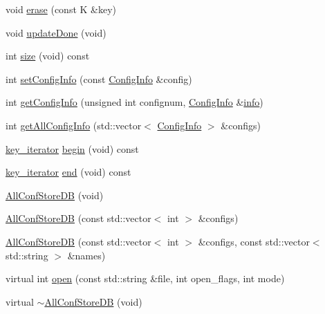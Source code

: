 \begin{DoxyCompactItemize}
\item 
void \mbox{\hyperlink{classFILEDB_1_1AllConfStoreDB_afb092d33f9ca14ca30918d6cb8251fdb}{erase}} (const K \&key)
\item 
void \mbox{\hyperlink{classFILEDB_1_1AllConfStoreDB_ac90e596f6c914145130719ec5ac13593}{update\+Done}} (void)
\item 
int \mbox{\hyperlink{classFILEDB_1_1AllConfStoreDB_a78dd830c5211b3b00b8eae6170ffc9d6}{size}} (void) const
\item 
int \mbox{\hyperlink{classFILEDB_1_1AllConfStoreDB_a2062f555d190a3c52cc942447a090b8a}{set\+Config\+Info}} (const \mbox{\hyperlink{classFILEDB_1_1ConfigInfo}{Config\+Info}} \&config)
\item 
int \mbox{\hyperlink{classFILEDB_1_1AllConfStoreDB_a351639b9e19297abfa7b8b1aca013770}{get\+Config\+Info}} (unsigned int confignum, \mbox{\hyperlink{classFILEDB_1_1ConfigInfo}{Config\+Info}} \&\mbox{\hyperlink{structinfo}{info}})
\item 
int \mbox{\hyperlink{classFILEDB_1_1AllConfStoreDB_aeb8e6daf1a1f9b7a19899cf7db365632}{get\+All\+Config\+Info}} (std\+::vector$<$ \mbox{\hyperlink{classFILEDB_1_1ConfigInfo}{Config\+Info}} $>$ \&configs)
\item 
\mbox{\hyperlink{classFILEDB_1_1AllConfStoreDB_a2ce8981ca7049ed0c2c6e438873a9c1b}{key\+\_\+iterator}} \mbox{\hyperlink{classFILEDB_1_1AllConfStoreDB_a7bb7f812d80471897860af5692eb5bd2}{begin}} (void) const
\item 
\mbox{\hyperlink{classFILEDB_1_1AllConfStoreDB_a2ce8981ca7049ed0c2c6e438873a9c1b}{key\+\_\+iterator}} \mbox{\hyperlink{classFILEDB_1_1AllConfStoreDB_a213c914b326e7769411e305ceb375b1d}{end}} (void) const
\item 
\mbox{\hyperlink{classFILEDB_1_1AllConfStoreDB_a72b72501b29029e2bfb682565f96eac0}{All\+Conf\+Store\+DB}} (void)
\item 
\mbox{\hyperlink{classFILEDB_1_1AllConfStoreDB_a9a8553b0ce3ac82be098130d08f62162}{All\+Conf\+Store\+DB}} (const std\+::vector$<$ int $>$ \&configs)
\item 
\mbox{\hyperlink{classFILEDB_1_1AllConfStoreDB_ab8b213578395f0ac7d436a82f4a26fe1}{All\+Conf\+Store\+DB}} (const std\+::vector$<$ int $>$ \&configs, const std\+::vector$<$ std\+::string $>$ \&names)
\item 
virtual int \mbox{\hyperlink{classFILEDB_1_1AllConfStoreDB_aa6e6deb3c33076d16db4ac0560f0d75f}{open}} (const std\+::string \&file, int open\+\_\+flags, int mode)
\item 
virtual \mbox{\hyperlink{classFILEDB_1_1AllConfStoreDB_ac5fe65eab60f20d7b8124c69c0bd5923}{$\sim$\+All\+Conf\+Store\+DB}} (void)

\end{DoxyCompactItemize}
